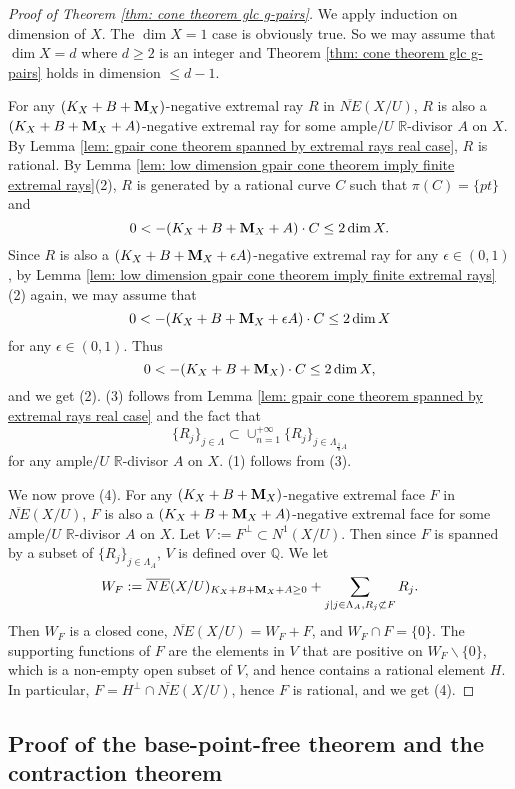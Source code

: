 \documentclass[11pt]{amsart}
\numberwithin{equation}{section}
\newcommand{\Mm}{{\bf{M}}}
\newcommand{\Qq}{\mathbb{Q}}
\newcommand{\Rr}{\mathbb{R}}
\theoremstyle{definition}
\theoremstyle{definition}
\theoremstyle{definition}
\begin{document}
\begin{proof}[Proof of Theorem \ref{thm: cone theorem glc g-pairs}]
We apply induction on dimension of $X$. The $\dim X=1$ case is obviously true. So we may assume that $\dim X=d$ where $d\geq 2$ is an integer and Theorem \ref{thm: cone theorem glc g-pairs} holds in dimension $\leq d-1$.

For any $(K_X+B+\Mm_X)$-negative extremal ray $R$ in $\overline{NE}(X/U)$, $R$ is also a $(K_X+B+\Mm_X+A)$-negative extremal ray for some ample$/U$ $\Rr$-divisor $A$ on $X$. By Lemma \ref{lem: gpair cone theorem spanned by extremal rays real case}, $R$ is rational. By Lemma \ref{lem: low dimension gpair cone theorem imply finite extremal rays}(2), $R$ is generated by a rational curve $C$ such that $\pi(C)=\{pt\}$ and $$0<-(K_X+B+\Mm_X+A)\cdot C\leq 2\dim X.$$ Since $R$ is also a $(K_X+B+\Mm_X+\epsilon A)$-negative extremal ray for any $\epsilon\in (0,1)$, by Lemma \ref{lem: low dimension gpair cone theorem imply finite extremal rays}(2) again, we may assume that $$0<-(K_X+B+\Mm_X+\epsilon A)\cdot C\leq 2\dim X$$ for any $\epsilon\in (0,1)$. Thus 
$$0<-(K_X+B+\Mm_X)\cdot C\leq 2\dim X,$$ 
and we get (2). (3) follows from Lemma \ref{lem: gpair cone theorem spanned by extremal rays real case} and the fact that $$\{R_j\}_{j\in\Lambda}\subset\cup_{n=1}^{+\infty}\{R_j\}_{j\in\Lambda_{\frac{1}{n}A}}$$ for any ample$/U$ $\Rr$-divisor $A$ on $X$. (1) follows from (3). 

We now prove (4). For any $(K_X+B+\Mm_X)$-negative extremal face $F$ in $\overline{NE}(X/U)$, $F$ is also a $(K_X+B+\Mm_X+A)$-negative extremal face for some ample$/U$ $\Rr$-divisor $A$ on $X$. Let $V:=F^\bot\subset N^1(X/U)$. Then since $F$ is spanned by a subset of $\{R_j\}_{j\in\Lambda_A}$, $V$ is defined over $\Qq$. We let
$$W_F:=\overline{NE}(X/U)_{K_X+B+\Mm_X+A\geq 0}+\sum_{j\mid j\in\Lambda_A,R_j\not\subset F}R_j.$$
Then $W_F$ is a closed cone, $\overline{NE}(X/U)=W_F+F$, and $W_F\cap F=\{0\}$. The supporting functions of $F$ are the elements in $V$ that are positive on $W_F\backslash\{0\}$, which is a non-empty open subset of $V$, and hence contains a rational element $H$. In particular, $F=H^\bot\cap \overline{NE}(X/U)$, hence $F$ is rational, and we get (4).
\end{proof}


\subsection{Proof of the base-point-free theorem and the contraction theorem}
\end{document}
